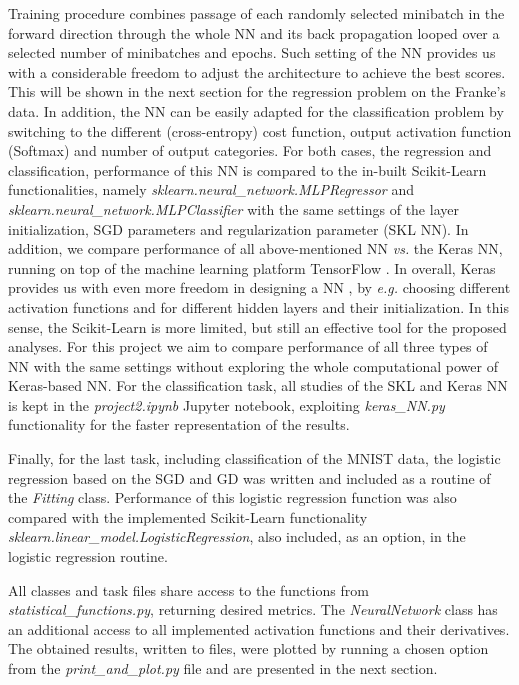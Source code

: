 \documentclass{emulateapj}
\begin{document}
Training procedure combines passage of each randomly selected minibatch in the forward direction through the whole NN and its back propagation looped over a selected number of minibatches and epochs. Such setting of the NN provides us with a considerable freedom to adjust the architecture to achieve the best scores. This will be shown in the next section for the regression problem on the Franke's data. In addition, the NN can be easily adapted for the classification problem by switching to the different (cross-entropy) cost function, output activation function (Softmax) and number of output categories. For both cases, the regression and classification, performance of this NN is compared to the in-built Scikit-Learn functionalities, namely \textit{sklearn.neural\_network.MLPRegressor} and \textit{sklearn.neural\_network.MLPClassifier} \cite{skl} with the same settings of the layer initialization, SGD parameters and regularization parameter (SKL NN). In addition, we compare performance of all above-mentioned NN \textit{vs.} the Keras NN, running on top of the machine learning platform TensorFlow \cite{keras}. In overall, Keras provides us with even more freedom in designing a NN , by \textit{e.g.} choosing different activation functions and for different hidden layers and their initialization. In this sense, the Scikit-Learn is more limited, but still an effective tool for the proposed analyses. For this project we aim to compare performance of all three types of NN with the same settings without exploring the whole computational power of Keras-based NN. For the classification task, all studies of the SKL and Keras NN is kept in the \textit{project2.ipynb} Jupyter notebook, exploiting \textit{keras\_NN.py} functionality for the faster representation of the results.  

Finally, for the last task, including classification of the MNIST data, the logistic regression based on the SGD and GD was written and included as a routine of the \textit{Fitting} class. Performance of this logistic regression function was also compared with the implemented Scikit-Learn functionality \textit{sklearn.linear\_model.LogisticRegression}, also included, as an option, in the logistic regression routine.


All classes and task files share access to the functions from \textit{statistical\_functions.py}, returning desired metrics. The \textit{NeuralNetwork} class has an additional access to all implemented activation functions and their derivatives. The obtained results, written to files, were plotted by running a chosen option from the \textit{print\_and\_plot.py} file and are presented in the next section.
\end{document}

